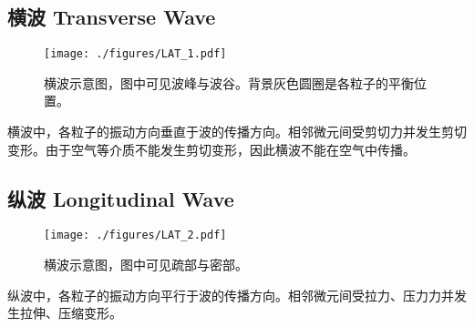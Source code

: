 
\subsection{横波 Transverse Wave}
\begin{figure}[ht]
\centering
\texttt{[image: ./figures/LAT\_1.pdf]}
\caption{横波示意图，图中可见波峰与波谷。背景灰色圆圈是各粒子的平衡位置。} \label{LAT_fig1}
\end{figure}
横波中，各粒子的振动方向垂直于波的传播方向。相邻微元间受剪切力并发生剪切变形。由于空气等介质不能发生剪切变形，因此横波不能在空气中传播。

\subsection{纵波 Longitudinal Wave}
\begin{figure}[ht]
\centering
\texttt{[image: ./figures/LAT\_2.pdf]}
\caption{横波示意图，图中可见疏部与密部。} \label{LAT_fig2}
\end{figure}
纵波中，各粒子的振动方向平行于波的传播方向。相邻微元间受拉力、压力力并发生拉伸、压缩变形。

